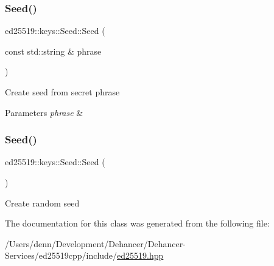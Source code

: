 \subsubsection{\texorpdfstring{Seed()}{Seed()}\hspace{0.1cm}{\footnotesize\ttfamily [1/2]}}
{\footnotesize\ttfamily ed25519\+::keys\+::\+Seed\+::\+Seed (\begin{DoxyParamCaption}\item[{const std\+::string \&}]{phrase }\end{DoxyParamCaption})}

Create seed from secret phrase 
\begin{DoxyParams}{Parameters}
{\em phrase} & \\
\hline
\end{DoxyParams}
\mbox{\label{classed25519_1_1keys_1_1_seed_a63f29cc0551495dc2084b6f862ed75b5}} 
\subsubsection{\texorpdfstring{Seed()}{Seed()}\hspace{0.1cm}{\footnotesize\ttfamily [2/2]}}
{\footnotesize\ttfamily ed25519\+::keys\+::\+Seed\+::\+Seed (\begin{DoxyParamCaption}{ }\end{DoxyParamCaption})}

Create random seed 

The documentation for this class was generated from the following file\+:\begin{DoxyCompactItemize}
\item 
/\+Users/denn/\+Development/\+Dehancer/\+Dehancer-\/\+Services/ed25519cpp/include/\mbox{\hyperlink{ed25519_8hpp}{ed25519.\+hpp}}\end{DoxyCompactItemize}
